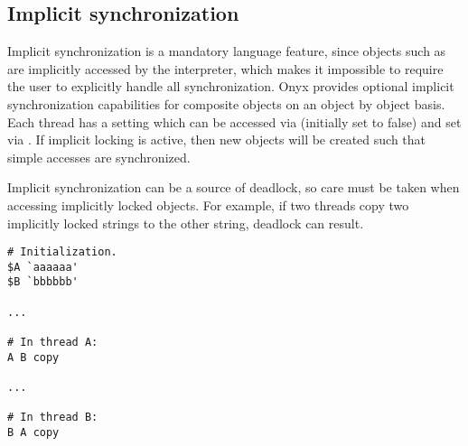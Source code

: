 \subsection{Implicit synchronization}
\label{sec:onyx_implicit_synchronization}

Implicit synchronization is a mandatory language feature, since objects such as
 are implicitly accessed by the
interpreter, which makes it impossible to require the user to explicitly handle
all synchronization.  Onyx provides optional implicit synchronization
capabilities for composite objects on an object by object basis.  Each thread
has a setting which can be accessed via
 (initially set
to false) and set via .
If implicit locking is active, then new objects will be created such that simple
accesses are synchronized.

Implicit synchronization can be a source of deadlock, so care must be taken when
accessing implicitly locked objects.  For example, if two threads copy two
implicitly locked strings to the other string, deadlock can result.

\begin{verbatim}
# Initialization.
$A `aaaaaa'
$B `bbbbbb'

...

# In thread A:
A B copy

...

# In thread B:
B A copy
\end{verbatim}

